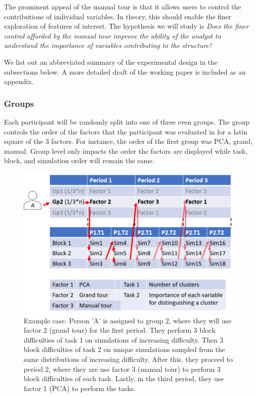 \documentclass[
  11,
]{article}
\begin{document}
The prominent appeal of the manual tour is that it allows users to control the contributions of individual variables. In theory, this should enable the finer exploration of features of interest. The hypothesis we will study is \emph{Does the finer control afforded by the manual tour improve the ability of the analyst to understand the importance of variables contributing to the structure?}

We list out an abbreviated summary of the experimental design in the subsections below. A more detailed draft of the working paper is included as an appendix.

\hypertarget{sec:groups}{%
\subsubsection{Groups}\label{sec:groups}}

Each participant will be randomly split into one of three even groups. The group controls the order of the factors that the participant was evaluated in for a latin square of the 3 factors. For instance, the order of the first group was PCA, grand, manual. Group level only impacts the order the factors are displayed while task, block, and simulation order will remain the same.

\begin{figure}[h]

{\centering \includegraphics[width=0.8\linewidth,]{./figures/experimental_design_personA} 

}

\caption{Example case. Person 'A' is assigned to group 2, where they will use factor 2 (grand tour) for the first period. They perform 3 block difficulties of task 1 on simulations of increasing difficulty. Then 3 block difficulties of task 2 on unique simulations sampled from the same distributions of increasing difficulty. After this, they proceed to period 2, where they are use factor 3 (manual tour) to perform 3 block difficulties of each task. Lastly, in the third period, they use factor 1 (PCA) to perform the tasks.}\label{fig:designExample}
\end{figure}
\end{document}
